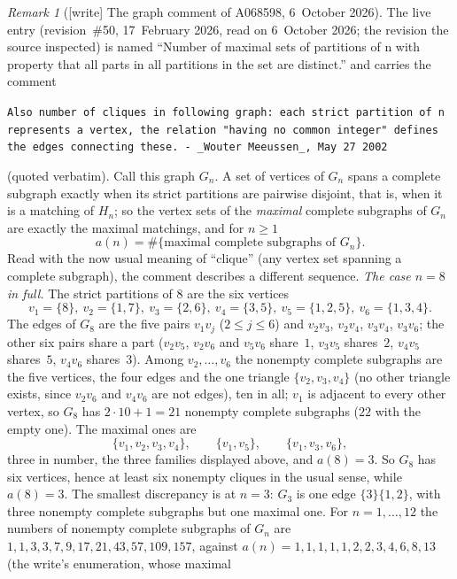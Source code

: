 \documentclass[11pt,letterpaper]{article}
\numberwithin{equation}{section}
\theoremstyle{remark}\newtheorem{remark}[theorem]{Remark}
\begin{document}
\begin{remark}[{[write]} The graph comment of A068598, 6~October 2026]\label{mdp:rem:cliques}
The live entry (revision~\#50, 17~February 2026, read on 6~October 2026;
the revision the source inspected) is named ``Number of maximal sets of
partitions of n with property that all parts in all partitions in the set
are distinct.'' and carries the comment
\begin{center}\small
\parbox{0.92\textwidth}{\raggedright\texttt{Also number of cliques in following graph: each strict partition of n represents a vertex, the relation "having no common integer" defines the edges connecting these. - \_Wouter Meeussen\_, May 27 2002}}
\end{center}
(quoted verbatim). Call this graph $G_n$. A set of vertices of $G_n$ spans a
complete subgraph exactly when its strict partitions are pairwise disjoint,
that is, when it is a matching of $H_n$; so the vertex sets of the
\emph{maximal} complete subgraphs of $G_n$ are exactly the maximal matchings,
and for $n\ge1$
\[
 a(n)=\#\{\text{maximal complete subgraphs of }G_n\}.
\]
Read with the now usual meaning of ``clique'' (any vertex set spanning a
complete subgraph), the comment describes a different sequence. \emph{The
case $n=8$ in full.} The strict partitions of $8$ are the six vertices
\[
 v_1=\{8\},\ v_2=\{1,7\},\ v_3=\{2,6\},\ v_4=\{3,5\},\ v_5=\{1,2,5\},\
 v_6=\{1,3,4\}.
\]
The edges of $G_8$ are the five pairs $v_1v_j$ ($2\le j\le6$) and $v_2v_3$,
$v_2v_4$, $v_3v_4$, $v_3v_6$; the other six pairs share a part ($v_2v_5$,
$v_2v_6$ and $v_5v_6$ share~$1$, $v_3v_5$ shares~$2$, $v_4v_5$ shares~$5$,
$v_4v_6$ shares~$3$). Among $v_2,\dots,v_6$ the nonempty complete subgraphs
are the five vertices, the four edges and the one triangle
$\{v_2,v_3,v_4\}$ (no other triangle exists, since $v_2v_6$ and $v_4v_6$ are
not edges), ten in all; $v_1$ is adjacent to every other vertex, so $G_8$
has $2\cdot10+1=21$ nonempty complete subgraphs ($22$ with the empty one).
The maximal ones are
\[
 \{v_1,v_2,v_3,v_4\},\qquad\{v_1,v_5\},\qquad\{v_1,v_3,v_6\},
\]
three in number, the three families displayed above, and $a(8)=3$. So $G_8$
has six vertices, hence at least six nonempty cliques in the usual sense,
while $a(8)=3$. The smallest discrepancy is at $n=3$: $G_3$ is one edge
$\{3\}\{1,2\}$, with three nonempty complete subgraphs but one maximal one.
For $n=1,\dots,12$ the numbers of nonempty complete subgraphs of $G_n$ are
$1,1,3,3,7,9,17,21,43,57,109,157$, against
$a(n)=1,1,1,1,1,2,2,3,4,6,8,13$ (the write's enumeration, whose maximal

\end{remark}
\end{document}
